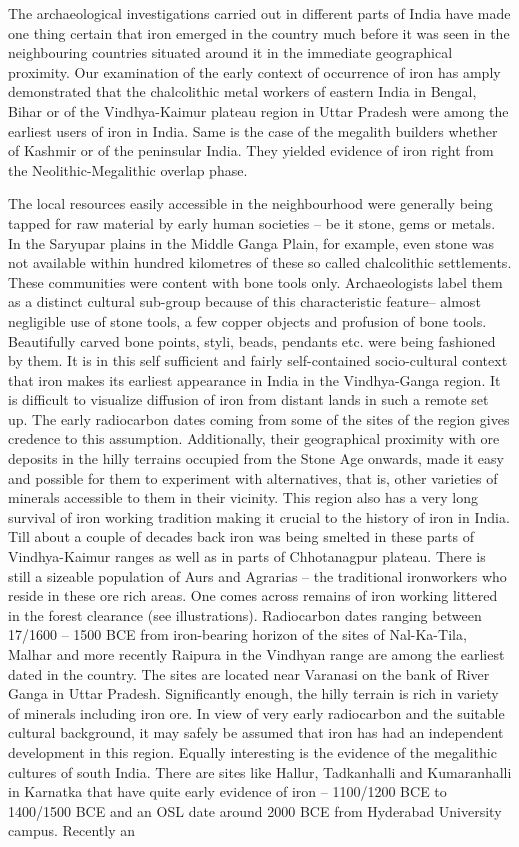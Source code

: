 The archaeological investigations carried out in different parts of India have made one thing certain that iron emerged in the country much before it was seen in the neighbouring countries situated around it in the immediate geographical proximity. Our examination of the early context of occurrence of iron has amply demonstrated that the chalcolithic metal workers of eastern India in Bengal, Bihar or of the Vindhya-Kaimur plateau region in Uttar Pradesh were among the earliest users of iron in India. Same is the case of the megalith builders whether of Kashmir or of the peninsular India. They yielded evidence of iron right from the Neolithic-Megalithic overlap phase.

The local resources easily accessible in the neighbourhood were generally being tapped for raw material by early human societies – be it stone, gems or metals. In the Saryupar plains in the Middle Ganga Plain, for example, even stone was not available within hundred kilometres of these so called chalcolithic settlements. These communities were content with bone tools only. Archaeologists label them as a distinct cultural sub-group because of this characteristic feature– almost negligible use of stone tools, a few copper objects and profusion of bone tools. Beautifully carved bone points, styli, beads, pendants etc. were being fashioned by them. It is in this self sufficient and fairly self-contained socio-cultural context that iron makes its earliest appearance in India in the Vindhya-Ganga region. It is difficult to visualize diffusion of iron from distant lands in such a remote set up. The early radiocarbon dates coming from some of the sites of the region gives credence to this assumption. Additionally, their geographical proximity with ore deposits in the hilly terrains occupied from the Stone Age onwards, made it easy and possible for them to experiment with alternatives, that is, other varieties of minerals accessible to them in their vicinity. This region also has a very long survival of iron working tradition making it crucial to the history of iron in India. Till about a couple of decades back iron was being smelted in these parts of Vindhya-Kaimur ranges as well as in parts of Chhotanagpur plateau. There is still a sizeable population of Aurs and Agrarias – the traditional ironworkers who reside in these ore rich areas. One comes across remains of iron working littered in the forest clearance (see illustrations). Radiocarbon dates ranging between 17/1600 – 1500 BCE from iron-bearing horizon of the sites of Nal-Ka-Tila,  Malhar and more recently Raipura in the Vindhyan range are among the earliest dated in the country. The sites are located near Varanasi on the bank of River Ganga in Uttar Pradesh. Significantly enough, the hilly terrain is rich in variety of minerals including iron ore. In view of very early radiocarbon and the suitable cultural background, it may safely be assumed that iron has had an independent development in this region. Equally interesting is the evidence of the megalithic cultures of south India. There are sites like Hallur, Tadkanhalli and Kumaranhalli in Karnatka that have quite early evidence of iron – 1100/1200 BCE to 1400/1500 BCE and an OSL date around 2000 BCE from Hyderabad University campus. Recently an 